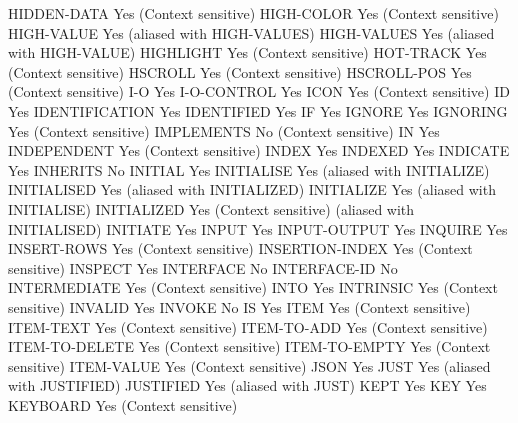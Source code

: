 HIDDEN-DATA                     Yes (Context sensitive)
HIGH-COLOR                      Yes (Context sensitive)
HIGH-VALUE                      Yes (aliased with HIGH-VALUES)
HIGH-VALUES                     Yes (aliased with HIGH-VALUE)
HIGHLIGHT                       Yes (Context sensitive)
HOT-TRACK                       Yes (Context sensitive)
HSCROLL                         Yes (Context sensitive)
HSCROLL-POS                     Yes (Context sensitive)
I-O                             Yes
I-O-CONTROL                     Yes
ICON                            Yes (Context sensitive)
ID                              Yes
IDENTIFICATION                  Yes
IDENTIFIED                      Yes
IF                              Yes
IGNORE                          Yes
IGNORING                        Yes (Context sensitive)
IMPLEMENTS                      No (Context sensitive)
IN                              Yes
INDEPENDENT                     Yes (Context sensitive)
INDEX                           Yes
INDEXED                         Yes
INDICATE                        Yes
INHERITS                        No
INITIAL                         Yes
INITIALISE                      Yes (aliased with INITIALIZE)
INITIALISED                     Yes (aliased with INITIALIZED)
INITIALIZE                      Yes (aliased with INITIALISE)
INITIALIZED                     Yes (Context sensitive) (aliased with INITIALISED)
INITIATE                        Yes
INPUT                           Yes
INPUT-OUTPUT                    Yes
INQUIRE                         Yes
INSERT-ROWS                     Yes (Context sensitive)
INSERTION-INDEX                 Yes (Context sensitive)
INSPECT                         Yes
INTERFACE                       No
INTERFACE-ID                    No
INTERMEDIATE                    Yes (Context sensitive)
INTO                            Yes
INTRINSIC                       Yes (Context sensitive)
INVALID                         Yes
INVOKE                          No
IS                              Yes
ITEM                            Yes (Context sensitive)
ITEM-TEXT                       Yes (Context sensitive)
ITEM-TO-ADD                     Yes (Context sensitive)
ITEM-TO-DELETE                  Yes (Context sensitive)
ITEM-TO-EMPTY                   Yes (Context sensitive)
ITEM-VALUE                      Yes (Context sensitive)
JSON                            Yes
JUST                            Yes (aliased with JUSTIFIED)
JUSTIFIED                       Yes (aliased with JUST)
KEPT                            Yes
KEY                             Yes
KEYBOARD                        Yes (Context sensitive)
